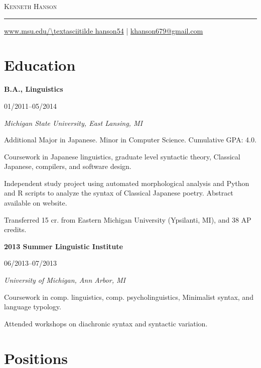 \documentclass[10pt,oneside]{article}
\makeatletter
\newcommand{\name}{Kenneth Hanson}
\newcommand{\email}{khanson679@gmail.com}
\newcommand{\website}{www.msu.edu/\textasciitilde hanson54}
\newcommand{\bigname}{%
	{\centering\scshape\Huge \name \par}
}
\newcommand{\contactinfo}{%
	{\raggedleft\small \url{\website} | \href{mailto:\email}{\email} \par}
}
\newcommand{\topheading}{%
	\bigname
	\rule{\textwidth}{1pt} \par
	\contactinfo
}
\newcommand{\ressection}[1]{
	\vspace{-12pt}
	\section*{#1}
}
\newcommand{\resbigitem}[4]{
	\item \parbox[t]{0.8\textwidth}{\textbf{#1}} \hfill #2 \\
		\parbox[t]{0.8\textwidth}{\textit{#3}} \hfill \textit{#4}
}
\makeatother
\begin{document}
\topheading

\ressection{Education}

\begin{reslist}
	\resbigitem{B.A., Linguistics}
		{01/2011--05/2014}
		{Michigan State University, East Lansing, MI}
		{}
	\begin{reslist}
		\item Additional Major in Japanese. Minor in Computer Science. Cumulative GPA: 4.0.
		\item Coursework in Japanese linguistics, graduate level syntactic theory, Classical Japanese, compilers, and software design.
		\item Independent study project using automated morphological analysis and Python and R scripts to analyze the syntax of Classical Japanese poetry. Abstract available on website.
		\item Transferred 15 cr. from Eastern Michigan University (Ypsilanti, MI), and 38 AP credits.
	\end{reslist}
	
	\resbigitem{2013 Summer Linguistic Institute}
		{06/2013--07/2013}
		{University of Michigan, Ann Arbor, MI}
		{}
	\begin{reslist}
		\item Coursework in comp. linguistics, comp. psycholinguistics, Minimalist syntax, and language typology.
		\item Attended workshops on diachronic syntax and syntactic variation.
	\end{reslist}
\end{reslist}


\ressection{Positions}
\end{document}
